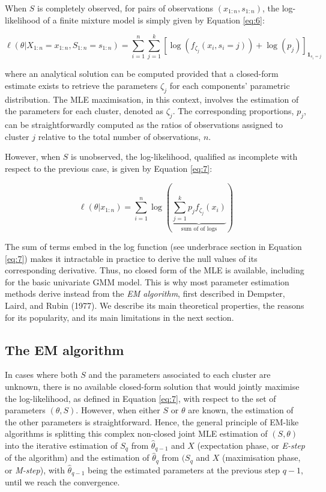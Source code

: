 When \(S\) is completely observed, for pairs of observations
\((x_{1:n}, s_{1:n})\), the log-likelihood of a finite mixture model is
simply given by Equation \eqref{eq:6}:

\begin{equation}
\ell(\theta|X_{1:n}=x_{1:n}, S_{1:n}=s_{1:n})=\sum_{i=1}^n \sum_{j=1}^k \left[\log\left(f_{\zeta_j} (x_i, s_i=j)\right) + \log(p_j) \right]_{\mathbf{1}_{s_i=j}}
\label{eq:6}
\end{equation}

where an analytical solution can be computed provided that a closed-form estimate exists to retrieve the parameters \(\zeta_j\) for each components' parametric distribution. The MLE maximisation, in this context, involves the estimation of the parameters for each cluster, denoted as \(\zeta_j\). The corresponding proportions, \(p_j\), can be straightforwardly computed as the ratios of observations assigned to cluster \(j\) relative to the total number of observations, \(n\).

However, when \(S\) is unobserved, the log-likelihood, qualified as
incomplete with respect to the previous case, is given by Equation
\eqref{eq:7}:

\begin{equation}
\ell (\theta \vert x_{1:n}) = \sum_{i=1}^n  \log \left( \underbrace{\sum_{j=1}^k  p_j f_{\zeta_j}(x_i)}_{\text{sum of of logs}} \right)
\label{eq:7}
\end{equation}

The sum of terms embed in the log function (see underbrace section in Equation \eqref{eq:7}) makes it intractable in practice to derive the null values of its corresponding derivative. Thus, no closed form of the MLE is available,
including for the basic univariate GMM model. This is why most
parameter estimation methods derive instead from the \emph{EM algorithm},
first described in Dempster, Laird, and Rubin (1977). We describe its main theoretical properties, the reasons for its popularity, and its main limitations in the next section.

\hypertarget{the-em-algorithm}{%
\subsection{The EM algorithm}\label{the-em-algorithm}}

In cases where both \(S\) and the parameters associated to each cluster are unknown, there is no available closed-form solution that would jointly maximise the log-likelihood, as defined in Equation \eqref{eq:7}, with respect to the set of parameters \(({\theta}, S)\).
However, when either \(S\) or \(\theta\) are known, the estimation of the
other parameters is straightforward. Hence, the general principle of
EM-like algorithms is splitting this complex non-closed joint MLE
estimation of \((S, \theta)\) into the iterative estimation of \(S_q\) from
\(\hat{\theta}_{q-1}\) and \(X\) (expectation phase, or \emph{E-step} of the algorithm)
and the estimation of \(\hat{\theta}_{q}\) from \((S_q\) and \(X\) (maximisation phase, or \emph{M-step}), with \(\hat{\theta}_{q-1}\) being the estimated parameters at the
previous step \(q-1\), until we reach the convergence.


